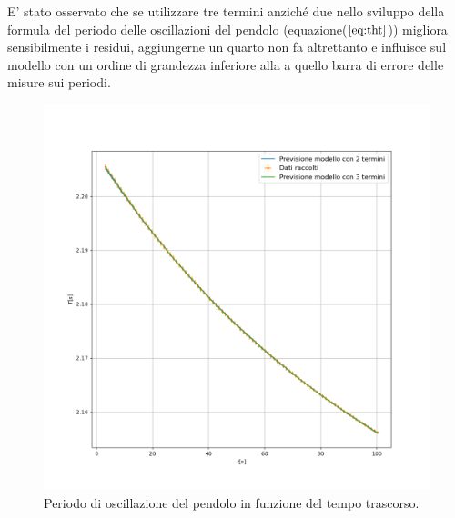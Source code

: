 \documentclass{article}
\begin{document}
E' stato osservato che se utilizzare tre termini anziché due nello sviluppo della formula del periodo delle oscillazioni del pendolo (equazione($\ref{eq:tht}$)) migliora sensibilmente i residui, aggiungerne un quarto non fa altrettanto e influisce sul modello con un ordine di grandezza inferiore alla a quello barra di errore delle misure sui periodi.


\begin{figure}[h!]
	\includegraphics[width=\textwidth]{plot_Periods-time.png}
	\caption{Periodo di oscillazione del pendolo in funzione del tempo trascorso.}
	\label{fig:pt}
\end{figure}
\end{document}
